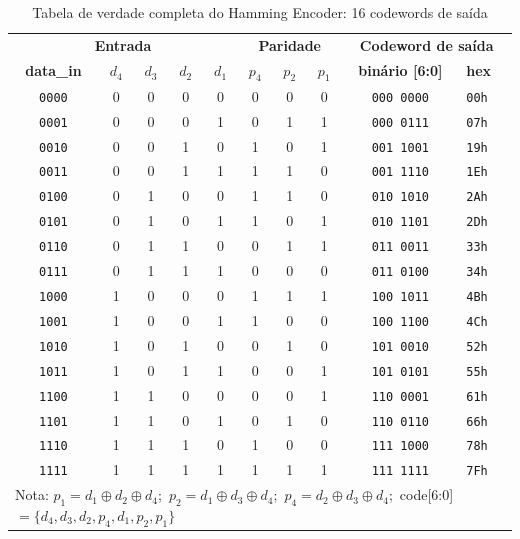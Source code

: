 \documentclass[12pt,a4paper]{article}
\begin{document}
\begin{table}[h!]
\centering
\caption{Tabela de verdade completa do Hamming Encoder: 16 codewords de saída}
\label{tab:truth}
\small
{}
\begin{tabular}{c c c c c | c c c | c l}
\toprule
\multicolumn{5}{c|}{\textbf{Entrada}} & \multicolumn{3}{c|}{\textbf{Paridade}} & \multicolumn{2}{c}{\textbf{Codeword de saída}} \\
\textbf{data\_in} & $d_4$ & $d_3$ & $d_2$ & $d_1$ & $p_4$ & $p_2$ & $p_1$ & \textbf{binário [6:0]} & \textbf{hex} \\
\midrule
\texttt{0000} & 0 & 0 & 0 & 0 & 0 & 0 & 0 & \texttt{000\,0000} & \texttt{00h} \\
\texttt{0001} & 0 & 0 & 0 & 1 & 0 & 1 & 1 & \texttt{000\,0111} & \texttt{07h} \\
\texttt{0010} & 0 & 0 & 1 & 0 & 1 & 0 & 1 & \texttt{001\,1001} & \texttt{19h} \\
\texttt{0011} & 0 & 0 & 1 & 1 & 1 & 1 & 0 & \texttt{001\,1110} & \texttt{1Eh} \\
\texttt{0100} & 0 & 1 & 0 & 0 & 1 & 1 & 0 & \texttt{010\,1010} & \texttt{2Ah} \\
\texttt{0101} & 0 & 1 & 0 & 1 & 1 & 0 & 1 & \texttt{010\,1101} & \texttt{2Dh} \\
\texttt{0110} & 0 & 1 & 1 & 0 & 0 & 1 & 1 & \texttt{011\,0011} & \texttt{33h} \\
\texttt{0111} & 0 & 1 & 1 & 1 & 0 & 0 & 0 & \texttt{011\,0100} & \texttt{34h} \\
\texttt{1000} & 1 & 0 & 0 & 0 & 1 & 1 & 1 & \texttt{100\,1011} & \texttt{4Bh} \\
\texttt{1001} & 1 & 0 & 0 & 1 & 1 & 0 & 0 & \texttt{100\,1100} & \texttt{4Ch} \\
\texttt{1010} & 1 & 0 & 1 & 0 & 0 & 1 & 0 & \texttt{101\,0010} & \texttt{52h} \\
\texttt{1011} & 1 & 0 & 1 & 1 & 0 & 0 & 1 & \texttt{101\,0101} & \texttt{55h} \\
\texttt{1100} & 1 & 1 & 0 & 0 & 0 & 0 & 1 & \texttt{110\,0001} & \texttt{61h} \\
\texttt{1101} & 1 & 1 & 0 & 1 & 0 & 1 & 0 & \texttt{110\,0110} & \texttt{66h} \\
\texttt{1110} & 1 & 1 & 1 & 0 & 1 & 0 & 0 & \texttt{111\,1000} & \texttt{78h} \\
\texttt{1111} & 1 & 1 & 1 & 1 & 1 & 1 & 1 & \texttt{111\,1111} & \texttt{7Fh} \\
\bottomrule
\multicolumn{10}{l}{\small Nota: $p_1 = d_1 \oplus d_2 \oplus d_4$;\ $p_2 = d_1 \oplus d_3 \oplus d_4$;\ $p_4 = d_2 \oplus d_3 \oplus d_4$;\ code[6:0] $= \{d_4, d_3, d_2, p_4, d_1, p_2, p_1\}$}
\end{tabular}
\end{table}
\end{document}
